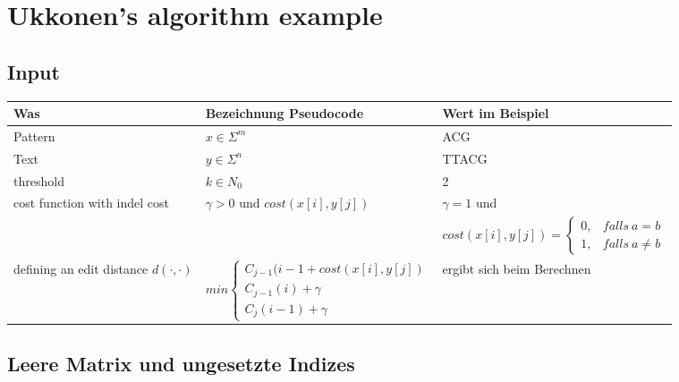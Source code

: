
\section{Ukkonen's algorithm example}\label{sec:ukkonens-algorithm-example}

\subsection*{Input}
\begin{center}
    \begin{tabular}{|p{5cm}|p{5cm}|p{6cm}|} \hline
    \textbf{Was} & \textbf{Bezeichnung Pseudocode} &\textbf{Wert im Beispiel} \\ \hline
    Pattern & $x \in \Sigma^m$ & ACG \\ \hline
    Text &  $y \in \Sigma^n$ &   TTACG  \\\hline
    threshold & $k \in N_0$ & 2 \\\hline
    cost function with indel cost & $\gamma > 0$ und $cost(x[i], y[j])$ & $\gamma = 1$ und  \\ & &
    $cost(x[i], y[j])=\begin{cases}
                          0, & falls\ a=b \\ 1, & falls\ a \neq b
    \end{cases}$
    \\ \hline
    defining an edit distance $d(\cdot, \cdot)$ &  $min \begin{cases}
                                                            C_{j-1}(i-1 + cost(x[i], y[j]) \\
                                                            C_{j-1}(i) + \gamma \\ C_j (i-1) + \gamma
    \end{cases}$ & ergibt sich beim Berechnen \\ \hline
    \end{tabular}
\end{center}

\subsection*{Leere Matrix und ungesetzte Indizes}

